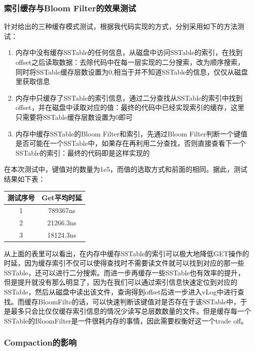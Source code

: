 \documentclass{article}
\begin{document}
\subsubsection{索引缓存与Bloom Filter的效果测试}

针对给出的三种缓存模式测试，根据我代码实现的方式，分别采用如下的方法测试：

\begin{enumerate}
    \item 内存中没有缓存SSTable的任何信息，从磁盘中访问SSTable的索引，在找到offset之后读取数据：去除代码中在每一层实现的二分搜索，改为顺序搜索，同时将SSTable缓存层数设置为0,相当于并不知道SSTable的信息，仅仅从磁盘里获取信息
    \item 内存中只缓存了SSTable的索引信息，通过二分查找从SSTable的索引中找到offset，并在磁盘中读取对应的值：最终的代码中已经实现索引的缓存，这里只需要将SSTable缓存层数设置为0即可
    \item 内存中缓存SSTable的Bloom Filter和索引，先通过Bloom Filter判断一个键值是否可能在一个SSTable中，如果存在再利用二分查找，否则直接查看下一个SSTable的索引：最终的代码即是这样实现的
\end{enumerate}

在本次测试中，键值对的数量为1e5，而值的选取方式和前面的相同。据此，测试结果如下表：

\begin{table}[h]
    \centering
    \begin{tabular}{cc}
        \toprule
        测试序号 & Get平均时延 \\
        \midrule
        1        & 789367ns    \\
        2        & 21266.3ns   \\
        3        & 18124.3ns   \\
        \bottomrule
    \end{tabular}
\end{table}

从上面的表里可以看出，在内存中缓存SSTable的索引可以极大地降低GET操作的时延，因为缓存索引不仅可以使得查找时不需要读文件就可以找到对应的那一些SSTable，还可以进行二分搜索。而进一步再缓存一些SSTable也有效率的提升，但是提升就没有那么明显了，因为在我们可以通过索引信息快速定位到对应的SSTable，然后从磁盘中读出该文件，查询得到offset后进一步进入vLog中进行查找。而缓存BloomFilte的话，可以快速判断该键值对是否存在于该SSTable中，于是最多只会比仅仅缓存索引信息的情况少读写总层数数量的文件。但是缓存每一个SSTable的BloomFilter是一件很耗内存的事情，因此需要权衡好这一个trade off。

\subsubsection{Compaction的影响}
\end{document}
